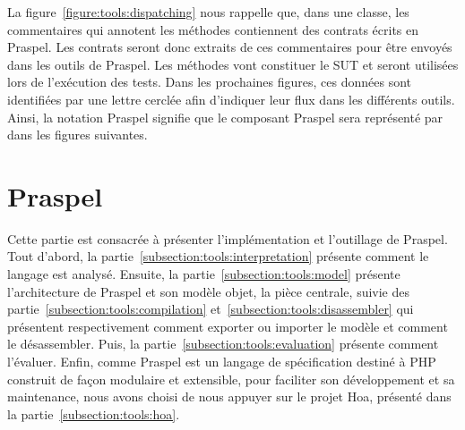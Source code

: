 La figure~\ref{figure:tools:dispatching} nous rappelle que, dans une classe, les
commentaires qui annotent les méthodes contiennent des contrats écrits en
Praspel. Les contrats seront donc extraits de ces commentaires pour être envoyés
dans les outils de Praspel. Les méthodes vont constituer le SUT et seront
utilisées lors de l'exécution des tests. Dans les prochaines figures, ces
données sont identifiées par une lettre cerclée afin d'indiquer leur flux dans
les différents outils. Ainsi, la notation Praspel  signifie que le composant Praspel
sera représenté par  dans les figures suivantes.

\section{Praspel}
\label{section:tools:praspel}

Cette partie est consacrée à présenter l'implémentation et l'outillage de
Praspel. Tout d'abord, la partie~\ref{subsection:tools:interpretation} présente
comment le langage est analysé. Ensuite, la partie~\ref{subsection:tools:model}
présente l'architecture de Praspel et son modèle objet, la pièce centrale,
suivie des partie~\ref{subsection:tools:compilation}
et~\ref{subsection:tools:disassembler} qui présentent respectivement comment
exporter ou importer le modèle et comment le désassembler. Puis, la
partie~\ref{subsection:tools:evaluation} présente comment l'évaluer. Enfin,
comme Praspel est un langage de spécification destiné à PHP construit de façon
modulaire et extensible, pour faciliter son développement et sa maintenance,
nous avons choisi de nous appuyer sur le projet Hoa, présenté dans la
partie~\ref{subsection:tools:hoa}.

